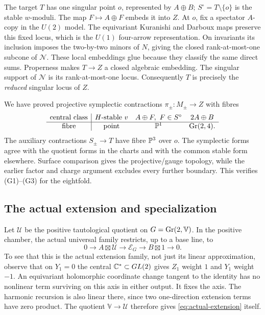 The target \(T\) has one singular point \(o\), represented by
\(A\oplus B\); \(S^\circ=T\setminus\{o\}\) is the stable
\(w\)-moduli. The map \(F\mapsto A\oplus F\) embeds it into \(Z\).
At \(o\), fix a spectator \(A\)-copy in the \(U(2)\) model.
The equivariant Kuranishi and Darboux maps preserve this fixed
locus, which is the \(U(1)\) four-arrow representation.
On invariants its inclusion imposes the two-by-two minors of
\(N\), giving the closed rank-at-most-one subcone of \(\mathcal N\).
These local embeddings glue because they classify the same
direct sums. Properness makes \(T\to Z\) a closed algebraic
embedding. The singular support of \(\mathcal N\) is its
rank-at-most-one locus. Consequently \(T\) is precisely the
\emph{reduced} singular locus of \(Z\).

We have proved projective symplectic contractions
\(\pi_\pm:M_\pm\to Z\) with fibres
\[
 \begin{array}{c|ccc}
 \text{central class}&H\text{-stable }v&A\oplus F,\ F\in S^\circ&2A\oplus B\\ \hline
 \text{fibre}&\text{point}&\mathbb P^1&\operatorname{Gr}(2,4).
 \end{array}
\]
The auxiliary contractions \(S_\pm\to T\) have fibre \(\mathbb P^3\)
over \(o\). The symplectic forms agree with the quotient forms
in the charts and with the common stable form elsewhere.
Surface comparison gives the projective/gauge topology, while
the earlier factor and charge argument excludes every further
boundary. This verifies (G1)--(G3) for the eightfold.

\subsection{The actual extension and specialization}\label{subsec:specialization}
Let \(\mathcal U\) be the positive tautological quotient on
\(G=\operatorname{Gr}(2,\mathbb V)\). In the positive chamber, the actual
universal family restricts, up to a base line, to
\begin{equation}\label{eq:actual-extension}
 0\longrightarrow A\boxtimes\mathcal U
 \longrightarrow\mathcal E_G
 \longrightarrow B\boxtimes1\longrightarrow0 .
\end{equation}
To see that this is the actual extension family, not just its
linear approximation, observe that on \(Y_1=0\) the central
\(\mathbb C^*\subset GL(2)\) gives \(Z_1\) weight \(1\) and \(Y_1\)
weight \(-1\). An equivariant holomorphic coordinate change
tangent to the identity has no nonlinear term surviving on
this axis in either output. It fixes the axis. The harmonic
recursion is also linear there, since two one-direction
extension terms have zero product. The quotient
\(\mathbb V\to\mathcal U\) therefore gives
\eqref{eq:actual-extension} itself.

